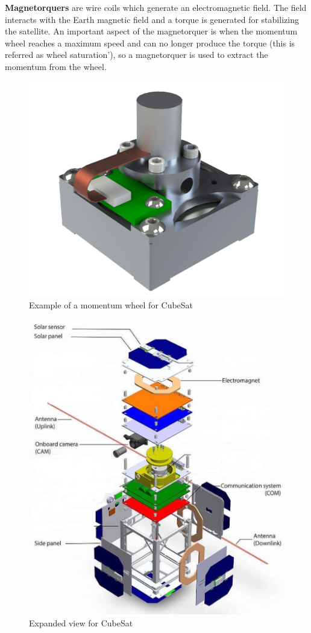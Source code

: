 \textbf{Magnetorquers} are wire coils which generate an electromagnetic field. The field interacts with the Earth magnetic field and a torque is generated for stabilizing the satellite. An important aspect of the magnetorquer is when the momentum wheel reaches a maximum speed and can no longer produce the torque (this is referred as wheel saturation'), so a magnetorquer is used to extract the momentum from the wheel.
%
\begin{table}[H]
	\begin{minipage}[b]{0.49\linewidth}
		\centering
		\begin{figure}[H]
			\centering
			\includegraphics[width=0.5\linewidth]{figures/MW}
			\caption{Example of a momentum wheel for CubeSat}
			\label{fig:MW}
		\end{figure}
	\end{minipage}\hfill
	\begin{minipage}[b]{0.49\linewidth}
		\centering
		\begin{figure}[H]
			\centering
			\includegraphics[width=1\linewidth]{figures/cubsat_copy}
			\caption{Expanded view for CubeSat}
			\label{fig:cub}
		\end{figure}
	\end{minipage}
\end{table}
